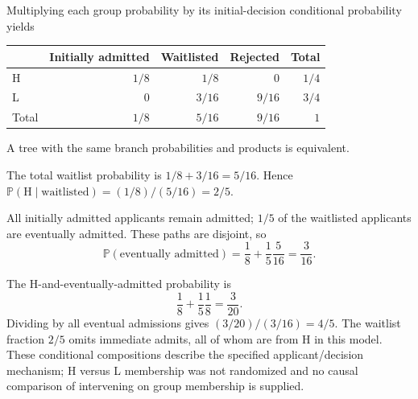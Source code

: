 \documentclass[11pt]{article}
\begin{document}
\begin{parts}
\item Multiplying each group probability by its initial-decision conditional probability yields
\begin{center}
\begin{tabular}{lrrrr}\toprule
 & Initially admitted & Waitlisted & Rejected & Total \\\midrule
H & $1/8$ & $1/8$ & $0$ & $1/4$ \\
L & $0$ & $3/16$ & $9/16$ & $3/4$ \\\midrule
Total & $1/8$ & $5/16$ & $9/16$ & $1$ \\\bottomrule
\end{tabular}
\end{center}
A tree with the same branch probabilities and products is equivalent.
\item The total waitlist probability is $1/8+3/16=5/16$. Hence $\mathbb P(\mathrm H\mid\text{waitlisted})=(1/8)/(5/16)=2/5$.
\item All initially admitted applicants remain admitted; $1/5$ of the waitlisted applicants are eventually admitted. These paths are disjoint, so
\[
\mathbb P(\text{eventually admitted})=\frac18+\frac15\frac5{16}=\frac3{16}.
\]
\item The H-and-eventually-admitted probability is
\[
\frac18+\frac15\frac18=\frac3{20}.
\]
Dividing by all eventual admissions gives $(3/20)/(3/16)=4/5$. The waitlist fraction $2/5$ omits immediate admits, all of whom are from H in this model. These conditional compositions describe the specified applicant/decision mechanism; H versus L membership was not randomized and no causal comparison of intervening on group membership is supplied.
\end{parts}
\end{document}
